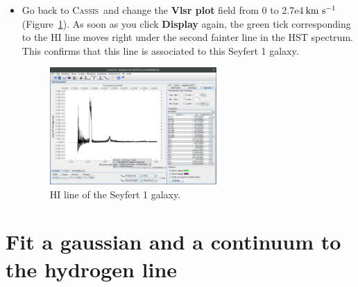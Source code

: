 \documentclass [a4paper, 12pt]{article}
\def\kms{\rm km\ s^{-1}}
\newcommand{\cassis}{{\textsc{Cassis}}}
\begin{document}
\begin{itemize}
\item Go back to \cassis\ and change the \textbf{Vlsr plot} field from 0 to 
2.7e4\,$\kms$ (Figure~\ref{fig:spectrum3}). As soon as you click 
\textbf{Display} again, the green tick 
corresponding to the HI line moves right under the second fainter line in the 
HST spectrum. This confirms that this line is associated to this Seyfert 1 
galaxy.
\begin{figure}[H]
\center
\includegraphics[width=0.6\textwidth]{../images/cassis_redshifted_line.png}
\caption{HI line of the Seyfert 1 galaxy.}
\label{fig:spectrum3}
\end{figure}
\end{itemize}

\section{Fit a gaussian and a continuum to the hydrogen line}
\end{document}
